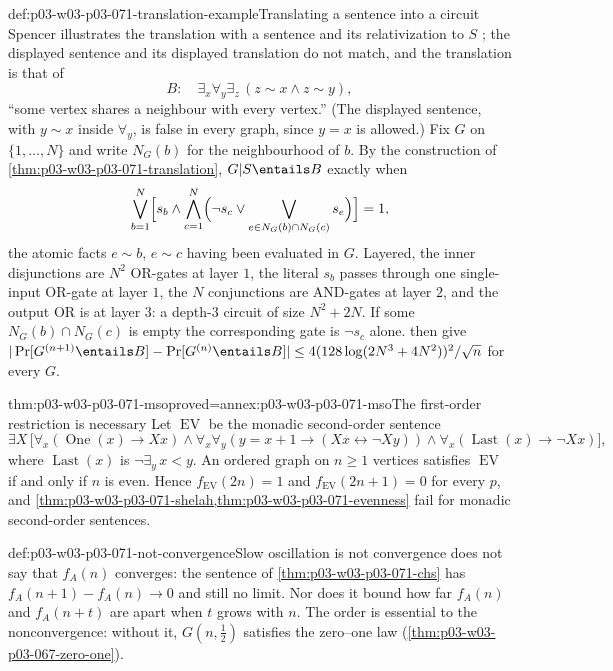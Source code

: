\begin{hbexample}{def:p03-w03-p03-071-translation-example}{Translating a sentence into a circuit}
Spencer illustrates the translation with a sentence and its relativization
to \(S\) \cite[p.~25]{Spencer2007LogicRandomStructuresAuthor}; the displayed
sentence and its displayed translation do not match, and the translation is
that of
\[
  B:\quad\exists_x\forall_y\exists_z\,(z\sim x\wedge z\sim y),
\]
``some vertex shares a neighbour with every vertex.''  (The displayed
sentence, with \(y\sim x\) inside \(\forall_y\), is false in every graph,
since \(y=x\) is allowed.)  Fix \(G\) on \(\{1,\ldots,N\}\) and write
\(N_G(b)\) for the neighbourhood of \(b\).  By the construction of
\cref{thm:p03-w03-p03-071-translation}, \(G|S\entails B\) exactly when
\[
  \bigvee_{b=1}^{N}\Bigl[s_b\wedge\bigwedge_{c=1}^{N}\Bigl(\neg s_c\vee
  \bigvee_{e\in N_G(b)\cap N_G(c)}s_e\Bigr)\Bigr]=1,
\]
the atomic facts \(e\sim b\), \(e\sim c\) having been evaluated in \(G\).
Layered, the inner disjunctions are \(N^2\) OR-gates at layer \(1\), the
literal \(s_b\) passes through one single-input OR-gate at layer \(1\), the
\(N\) conjunctions are AND-gates at layer \(2\), and the output OR is at
layer \(3\): a depth-\(3\) circuit of size \(N^2+2N\).  If some
\(N_G(b)\cap N_G(c)\) is empty the corresponding gate is
\(\neg s_c\) alone.  
then give \(|\Pr[G^{(n+1)}\entails B]-\Pr[G^{(n)}\entails B]|\leq
4(128\log(2N^3+4N^2))^2/\sqrt n\) for every \(G\).
\end{hbexample}

\begin{hbtheorem}{thm:p03-w03-p03-071-mso}{proved=annex:p03-w03-p03-071-mso}{The first-order restriction is necessary}
Let \(\operatorname{EV}\) be the monadic second-order sentence
\[
  \exists X\,\bigl[\forall_x(\operatorname{One}(x)\to Xx)\wedge
  \forall_x\forall_y(y=x+1\to(Xx\leftrightarrow\neg Xy))\wedge
  \forall_x(\operatorname{Last}(x)\to\neg Xx)\bigr],
\]
where \(\operatorname{Last}(x)\) is \(\neg\exists_y\,x<y\).  An ordered graph
on \(n\geq1\) vertices satisfies \(\operatorname{EV}\) if and only if \(n\)
is even.  Hence \(f_{\operatorname{EV}}(2n)=1\) and
\(f_{\operatorname{EV}}(2n+1)=0\) for every \(p\), and
\cref{thm:p03-w03-p03-071-shelah,thm:p03-w03-p03-071-evenness} fail for
monadic second-order sentences.
\end{hbtheorem}

\begin{hbwarning}{def:p03-w03-p03-071-not-convergence}{Slow oscillation is not convergence}
 does not say that \(f_A(n)\) converges:
the sentence of \cref{thm:p03-w03-p03-071-chs} has \(f_A(n+1)-f_A(n)\to0\)
and still no limit.  Nor does it bound how far \(f_A(n)\) and \(f_A(n+t)\)
are apart when \(t\) grows with \(n\).  The order is essential to the
nonconvergence: without it, \(G(n,\frac12)\) satisfies the zero--one law
(\cref{thm:p03-w03-p03-067-zero-one}).
\end{hbwarning}

